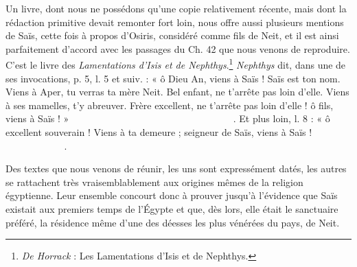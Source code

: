 \documentclass[letterpaper,twocolumn,openany,nodeprecatedcode]{dndbook}
\newcommand*\hieroAAAD{}
\newcommand*\hieroAAAG{}
\newcommand*\hieroAAAH{}
\newcommand*\hieroAAAI{}
\newcommand*\hieroAAAW{\raisebox{0.5ex}{}}
\newcommand*\hieroAABR{}
\newcommand*\hieroAACD{}
\newcommand*\hieroAACM{}
\newcommand*\hieroAACY{}
\newcommand*\hieroAADB{}
\newcommand*\hieroAADC{\raisebox{0.5ex}{}}
\newcommand*\hieroAADF{}
\newcommand*\hieroAADG{}
\newcommand*\hieroAADW{}
\newcommand*\hieroAAEL{}
\newcommand*\hieroAAEM{}
\newcommand*\hieroAAEN{}
\newcommand*\hieroAAEO{}
\newcommand*\hieroAAEP{\raisebox{0.5ex}{}}
\newcommand*\hieroAAEQ{}
\newcommand*\hieroAAER{}
\newcommand*\hieroAAES{\raisebox{0.5ex}{}}
\newcommand*\hieroAAET{}
\newcommand*\hieroAAEU{}
\newcommand*\hieroAAEV{}
\newcommand*\hieroAAEW{}
\newcommand*\hieroAAEX{}
\newcommand*\hieroAAEY{}
\newcommand*\hieroAAEZ{}
\newcommand*\hieroAAFA{}
\newcommand*\hieroAAFB{}
\newcommand*\hieroAAFC{}
\newcommand*\hieroAAFD{}
\newcommand*\hieroAAFE{}
\newcommand*\hieroAAFF{}
\newcommand*\hieroAAFG{}
\newcommand*\hieroAAFH{}
\newcommand*\hieroAAFI{}
\newcommand*\hieroAAFJ{}
\newcommand*\hieroAAFK{\raisebox{0.3ex}{}}
\newcommand*\hieroAAFL{}
\newcommand*\hieroAAFM{}
\newcommand*\hieroAAFN{\raisebox{0.5ex}{}}
\newcommand*\hieroAAFO{}
\newcommand*\hieroAAFP{}
\newcommand*\hieroAAFQ{}
\newcommand*\hieroAAFR{}
\newcommand*\hieroAAFS{}
\newcommand*\hieroAAFT{}
\newcommand*\hieroAAFU{}
\newcommand*\hieroAAFV{}
\begin{document}
Un livre, dont nous ne possédons qu'une copie relativement récente, mais dont la rédaction primitive devait remonter fort loin, nous offre aussi plusieurs mentions de Saïs, cette fois à propos d'Osiris, considéré comme fils de Neit, et il est ainsi parfaitement d'accord avec les passages du Ch. 42 que nous venons de reproduire. C'est le livre des \emph{Lamentations d'Isis et de Nephthys}.\footnote{\emph{De Horrack} : Les Lamentations d'Isis et de Nephthys.} \emph{Nephthys} dit, dans une de ses invocations, p. 5, l. 5 et suiv. : « ô Dieu An, viens à Saïs ! Saïs est ton nom. Viens à Aper, tu verras ta mère Neit. Bel enfant, ne t'arrête pas loin d'elle. Viens à ses mamelles, t'y abreuver. Frère excellent, ne t'arrête pas loin d'elle ! ô fils, viens à Saïs ! » $\hieroAAEL\:\hieroAAEM\:\hieroAADG\allowbreak\:\hieroAAEN\:\hieroAAEO\:\hieroAAEP\allowbreak\:\hieroAAAD\:\hieroAAEQ\:\hieroAADC\allowbreak\:\hieroAAAW\:\hieroAAAD\:\hieroAAAG\allowbreak\:\hieroAADC\:\hieroAAAW\:\hieroAAFU\allowbreak\:\hieroAACM\:\hieroAAER\:\hieroAADB\allowbreak\:\hieroAAES\:\hieroAADG\:\hieroAAEN\allowbreak\:\hieroAAET\:\hieroAAEU\:\hieroAAAW\allowbreak\:\hieroAAEV\:\hieroAAEW\:\hieroAACY\allowbreak\:\hieroAAES\:\hieroAAEX\:\hieroAAEY\allowbreak\:\hieroAAEZ\:\hieroAAFA\:\hieroAAFB\allowbreak\:\hieroAAEM\:\hieroAADW\:\hieroAAFC\allowbreak\:\hieroAAFD\:\hieroAAFE\:\hieroAAFF\allowbreak\:\hieroAADG\:\hieroAAAH\:\hieroAAFG\allowbreak\:\hieroAAFH\:\hieroAAFI\:\hieroAAFJ\allowbreak\:\hieroAAFD\:\hieroAAFK\:\hieroAAEZ\allowbreak\:\hieroAACM\:\hieroAAFL\:\hieroAAFM\allowbreak\:\hieroAAAH\:\hieroAABR\:\hieroAAFN\allowbreak\:\hieroAAFO\:\hieroAAAH\:\hieroAADB\allowbreak\:\hieroAAFB\:\hieroAAEM\:\hieroAADW\allowbreak\:\hieroAAFC\:\hieroAAFD\:\hieroAAFE\allowbreak\:\hieroAAFF\:\hieroAAAH\:\hieroAADF\allowbreak\:\hieroAAAI\:\hieroAADB\:\hieroAADG\allowbreak\:\hieroAAAH\:\hieroAAEO\allowbreak\:\hieroAAEP\:\hieroAAAD\allowbreak\:\hieroAAEQ\:\hieroAADC\:\hieroAAFP$. Et plus loin, l. 8 : « ô excellent souverain ! Viens à ta demeure ; seigneur de Saïs, viens à Saïs ! $\hieroAAAH\:\hieroAADF\:\hieroAAAH\allowbreak\:\hieroAACD\:\hieroAAAH\:\hieroAAAH\allowbreak\:\hieroAAFQ\:\hieroAADB\:\hieroAAFB\allowbreak\:\hieroAAFV\:\hieroAADG\:\hieroAAAH\:\hieroAAEO\allowbreak\:\hieroAAEP\:\hieroAAFR\:\hieroAAFS\:\hieroAAAD\allowbreak\:\hieroAAEQ\:\hieroAADC\:\hieroAAFT\:\hieroAADG\allowbreak\:\hieroAAAH\:\hieroAAEO\:\hieroAAEP\allowbreak\:\hieroAAAD\:\hieroAAAG\:\hieroAADC\:\hieroAAFT$.

Des textes que nous venons de réunir, les uns sont expressément datés, les autres se rattachent très vraisemblablement aux origines mêmes de la religion égyptienne. Leur ensemble concourt donc à prouver jusqu'à l'évidence que Saïs existait aux premiers temps de l'Égypte et que, dès lors, elle était le sanctuaire préféré, la résidence même d'une des déesses les plus vénérées du pays, de Neit.
\end{document}
